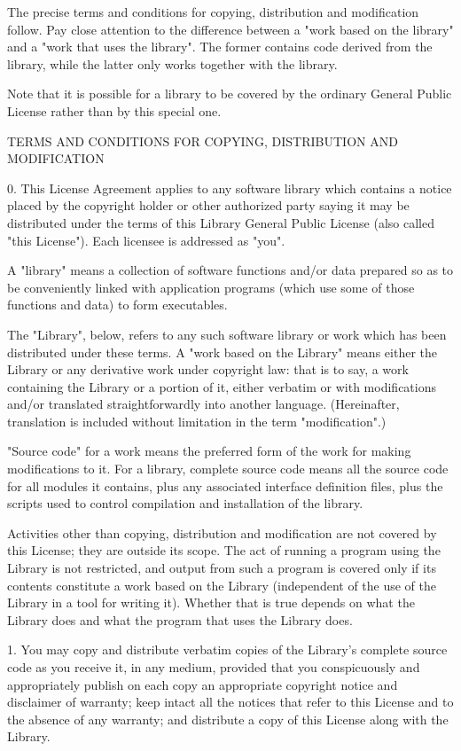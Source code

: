\begin{DoxyVerb}
The precise terms and conditions for copying, distribution and modification follow. Pay close
attention to the difference between a "work based on the library" and a "work that uses the
library". The former contains code derived from the library, while the latter only works together
with the library.

Note that it is possible for a library to be covered by the ordinary General Public License rather
than by this special one.

TERMS AND CONDITIONS FOR COPYING, DISTRIBUTION AND MODIFICATION

0. This License Agreement applies to any software library which contains a notice placed by the
copyright holder or other authorized party saying it may be distributed under the terms of this
Library General Public License (also called "this License"). Each licensee is addressed as "you".

A "library" means a collection of software functions and/or data prepared so as to be conveniently
linked with application programs (which use some of those functions and data) to form executables.

The "Library", below, refers to any such software library or work which has been distributed under
these terms. A "work based on the Library" means either the Library or any derivative work under
copyright law: that is to say, a work containing the Library or a portion of it, either verbatim or
with modifications and/or translated straightforwardly into another language. (Hereinafter,
translation is included without limitation in the term "modification".)

"Source code" for a work means the preferred form of the work for making modifications to it. For a
library, complete source code means all the source code for all modules it contains, plus any
associated interface definition files, plus the scripts used to control compilation and installation
of the library.

Activities other than copying, distribution and modification are not covered by this License; they
are outside its scope. The act of running a program using the Library is not restricted, and output
from such a program is covered only if its contents constitute a work based on the Library
(independent of the use of the Library in a tool for writing it). Whether that is true depends on
what the Library does and what the program that uses the Library does.

1. You may copy and distribute verbatim copies of the Library's complete source code as you receive
it, in any medium, provided that you conspicuously and appropriately publish on each copy an
appropriate copyright notice and disclaimer of warranty; keep intact all the notices that refer to
this License and to the absence of any warranty; and distribute a copy of this License along with
the Library.


\end{DoxyVerb}
